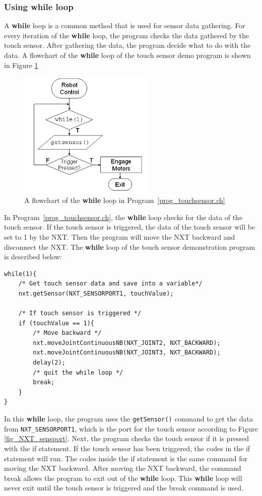 \documentclass[11pt]{article}
\begin{document}
\subsubsection*{Using while loop}
A {\bf while} loop is a common method that is used for sensor data gathering. For every iteration of the {\bf while} loop, 
the program checks the data gathered by the touch sensor. After gathering the data, the program decide what to 
do with the data. A flowchart of the {\bf while} loop of the touch sensor demo program is shown in Figure 
\ref{fig_NXT_touchflow}\\

\begin{figure}[h]
  \begin{center}
    \includegraphics[height=2.4in]{figure/mindstorm/NXT_touchflow.png}
    \caption{A flowchart of the {\bf while} loop in Program~\ref{prog_touchsensor.ch} \label{fig_NXT_touchflow}}
  \end{center}
\end{figure}

In Program~\ref{prog_touchsensor.ch}, the {\bf while} loop checks for the data of the touch sensor. 
If the touch sensor is triggered, the data of the touch sensor will be set to 1 by the NXT. Then 
the program will move the NXT backward and disconnect the NXT. The {\bf while} loop of the touch sensor 
demonstration program is described below:
\begin{lstlisting}
while(1){
    /* Get touch sensor data and save into a variable*/
    nxt.getSensor(NXT_SENSORPORT1, touchValue);
    
    /* If touch sensor is triggered */
    if (touchValue == 1){
        /* Move backward */
        nxt.moveJointContinuousNB(NXT_JOINT2, NXT_BACKWARD);
        nxt.moveJointContinuousNB(NXT_JOINT3, NXT_BACKWARD);
        delay(2);
        /* quit the while loop */
        break;
    }
}
\end{lstlisting}
In this {\bf while} loop, the program uses the \verb+getSensor()+ command to get the data from \verb+NXT_SENSORPORT1+, 
which is the port for the touch sensor according to Figure \ref{fig_NXT_sensport}. Next, the program checks 
the touch sensor if it is pressed with the if statement. If the touch sensor has been triggered, the codes 
in the if statement will run. The codes inside the if statement is the same command for moving the NXT 
backward. After moving the NXT backward, the command break allows the program to exit out of the {\bf while} loop.
This {\bf while} loop will never exit until the touch sensor is triggered and the break command is used.
\end{document}
